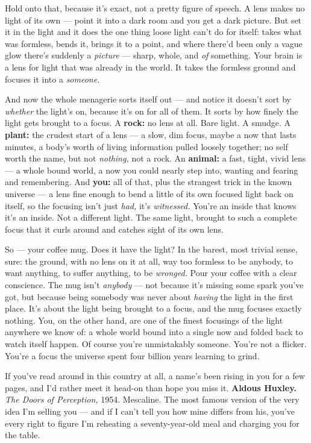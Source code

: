 \documentclass[11pt,openany]{book}
\begin{document}
Hold onto that, because it’s exact, not a pretty figure of speech. A lens makes no light of its own — point it into a dark room and you get a dark picture. But set it in the light and it does the one thing loose light can’t do for itself: takes what was formless, bends it, brings it to a point, and where there’d been only a vague glow there’s suddenly a \textit{picture} — sharp, whole, and \textit{of} something. Your brain is a lens for light that was already in the world. It takes the formless ground and focuses it into a \textit{someone.}

And now the whole menagerie sorts itself out — and notice it doesn’t sort by \textit{whether} the light’s on, because it’s on for all of them. It sorts by how finely the light gets brought to a focus. A \textbf{rock:} no lens at all. Bare light. A smudge. A \textbf{plant:} the crudest start of a lens — a slow, dim focus, maybe a now that lasts minutes, a body’s worth of living information pulled loosely together; no self worth the name, but not \textit{nothing,} not a rock. An \textbf{animal:} a fast, tight, vivid lens — a whole bound world, a now you could nearly step into, wanting and fearing and remembering. And \textbf{you:} all of that, plus the strangest trick in the known universe — a lens fine enough to bend a little of its own focused light back on itself, so the focusing isn’t just \textit{had,} it’s \textit{witnessed.} You’re an inside that knows it’s an inside. Not a different light. The same light, brought to such a complete focus that it curls around and catches sight of its own lens.

So — your coffee mug. Does it have the light? In the barest, most trivial sense, sure: the ground, with no lens on it at all, way too formless to be anybody, to want anything, to suffer anything, to be \textit{wronged.} Pour your coffee with a clear conscience. The mug isn’t \textit{anybody} — not because it’s missing some spark you’ve got, but because being somebody was never about \textit{having} the light in the first place. It’s about the light being brought to a focus, and the mug focuses exactly nothing. You, on the other hand, are one of the finest focusings of the light anywhere we know of: a whole world bound into a single now and folded back to watch itself happen. Of course you’re unmistakably someone. You’re not a flicker. You’re a focus the universe spent four billion years learning to grind.

If you’ve read around in this country at all, a name’s been rising in you for a few pages, and I’d rather meet it head-on than hope you miss it. \textbf{Aldous Huxley.} \textit{The Doors of Perception,} 1954. Mescaline. The most famous version of the very idea I’m selling you — and if I can’t tell you how mine differs from his, you’ve every right to figure I’m reheating a seventy-year-old meal and charging you for the table.
\end{document}
